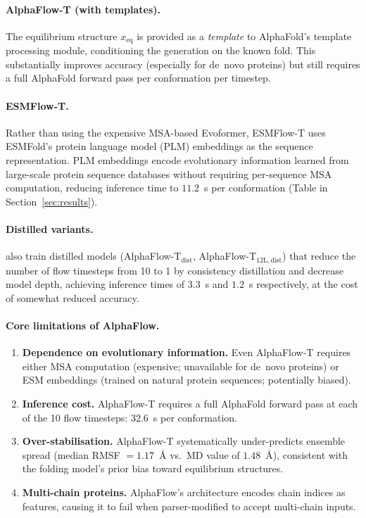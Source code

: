 \documentclass[12pt,a4paper]{article}
\newcommand{\xeq}{x_{\mathrm{eq}}}
\begin{document}
\paragraph{AlphaFlow-T (with templates).}
The equilibrium structure $\xeq$ is provided as a \emph{template} to AlphaFold's template
processing module, conditioning the generation on the known fold.  This substantially improves
accuracy (especially for de~novo proteins) but still requires a full AlphaFold forward pass
per conformation per timestep.

\paragraph{ESMFlow-T.}
Rather than using the expensive MSA-based Evoformer, ESMFlow-T uses ESMFold's \citep{lin2023}
protein language model (PLM) embeddings as the sequence representation.  PLM embeddings encode
evolutionary information learned from large-scale protein sequence databases without requiring
per-sequence MSA computation, reducing inference time to $11.2$~s per conformation (Table
in Section~\ref{sec:results}).

\paragraph{Distilled variants.}
\citet{jing2024alphaflow} also train distilled models (AlphaFlow-T$_{\mathrm{dist}}$,
AlphaFlow-T$_{12\mathrm{L,dist}}$) that reduce the number of flow timesteps from 10 to 1
by consistency distillation and decrease model depth, achieving inference times of $3.3$~s
and $1.2$~s respectively, at the cost of somewhat reduced accuracy.

\paragraph{Core limitations of AlphaFlow.}
\begin{enumerate}
  \item \textbf{Dependence on evolutionary information.}  Even AlphaFlow-T requires either
    MSA computation (expensive; unavailable for de~novo proteins) or ESM embeddings
    (trained on natural protein sequences; potentially biased).
  \item \textbf{Inference cost.}  AlphaFlow-T requires a full AlphaFold forward pass at each
    of the 10 flow timesteps: $32.6$~s per conformation.
  \item \textbf{Over-stabilisation.}  AlphaFlow-T systematically under-predicts ensemble
    spread (median RMSF $= 1.17$~Å vs.\ MD value of $1.48$~Å), consistent with the folding
    model's prior bias toward equilibrium structures.
  \item \textbf{Multi-chain proteins.}  AlphaFlow's architecture encodes chain indices as
    features, causing it to fail when parser-modified to accept multi-chain inputs.
\end{enumerate}
\end{document}
